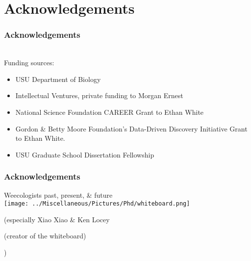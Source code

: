 \documentclass[14pt]{beamer}
\begin{document}

\section{Acknowledgements}
\begin{frame}[t]{}
\frametitle{Acknowledgements}
~\\ %
\small{Funding sources:}
\begin{small}
\begin{itemize}
\item USU Department of Biology
\item Intellectual Ventures, private funding to Morgan Ernest
\item National Science Foundation CAREER Grant to Ethan White
\item Gordon \& Betty Moore Foundation's Data-Driven Discovery Initiative Grant to Ethan White.
\item USU Graduate School Dissertation Fellowship
\end{itemize}
\end{small}
\end{frame}

\begin{frame}{}
\frametitle{Acknowledgements}
Weecologists past, present, \& future\\
\texttt{[image: ../Miscellaneous/Pictures/Phd/whiteboard.png]}
\begin{small}
(especially Xiao Xiao \& Ken Locey \begin{tiny}(creator of the whiteboard)\end{tiny})
\end{small}
\end{frame}
\end{document}
